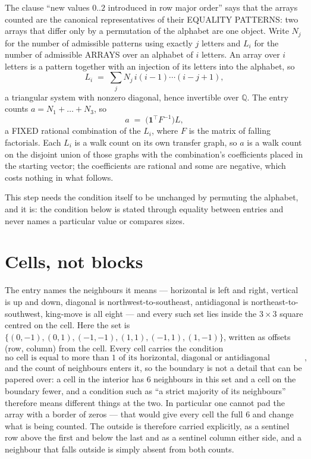 \documentclass[11pt,a4paper]{article}
\theoremstyle{plain}
\theoremstyle{definition}
\begin{document}
The clause ``new values $0..2$ introduced in row major order'' says that the arrays
counted are the canonical representatives of their EQUALITY PATTERNS: two arrays that differ
only by a permutation of the alphabet are one object. Write $N_j$ for the number of admissible
patterns using exactly $j$ letters and $L_i$ for the number of admissible ARRAYS over an
alphabet of $i$ letters. An array over $i$ letters is a pattern together with an injection of
its letters into the alphabet, so
\[
L_i\;=\;\sum_{j}N_j\,i(i-1)\cdots(i-j+1),
\]
a triangular system with nonzero diagonal, hence invertible over $\mathbb{Q}$. The entry
counts $a=N_1+\dots+N_{3}$, so
\[
a\;=\;\bigl(\mathbf{1}^{\!\top}F^{-1}\bigr)L ,
\]
a FIXED rational combination of the $L_i$, where $F$ is the matrix of falling factorials.
Each $L_i$ is a walk count on its own transfer graph, so $a$ is a walk count on the disjoint
union of those graphs with the combination's coefficients placed in the starting vector; the
coefficients are rational and some are negative, which costs nothing in what follows.

This step needs the condition itself to be unchanged by permuting the alphabet, and it is:
the condition below is stated through equality between entries and never names a particular
value or compares sizes.

\section{Cells, not blocks}

The entry names the neighbours it means --- horizontal is left and right, vertical is up and
down, diagonal is northwest-to-southeast, antidiagonal is northeast-to-southwest, king-move is
all eight --- and every such set lies inside the $3\times3$ square centred on the cell. Here
the set is $\{(0,-1), (0,1), (-1,-1), (1,1), (-1,1), (1,-1)\}$, written as offsets (row, column) from the cell. Every cell carries
the condition
\[
\text{no cell is equal to more than 1 of its horizontal, diagonal or antidiagonal neighbours},
\]
and the count of neighbours enters it, so the boundary is not a detail that can be papered
over: a cell in the interior has $6$ neighbours in this set and a cell on the boundary
fewer, and a condition such as ``a strict majority of its neighbours'' therefore means
different things at the two. In particular one cannot pad the array with a border of zeros ---
that would give every cell the full $6$ and change what is being counted. The outside is
therefore carried
explicitly, as a sentinel row above the first and below the last and as a sentinel column
either side, and a neighbour that falls outside is simply absent from both counts.
\end{document}
